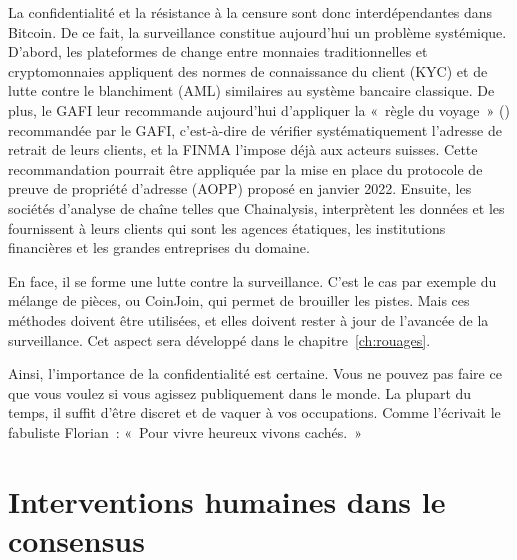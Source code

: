 La confidentialité et la résistance à la censure sont donc interdépendantes dans Bitcoin. De ce fait, la surveillance constitue aujourd'hui un problème systémique. D'abord, les plateformes de change entre monnaies traditionnelles et cryptomonnaies appliquent des normes de connaissance du client (KYC) et de lutte contre le blanchiment (AML) similaires au système bancaire classique. De plus, le GAFI leur recommande aujourd'hui d'appliquer la «~règle du voyage~» ()  recommandée par le GAFI, c'est-à-dire de vérifier systématiquement l'adresse de retrait de leurs clients, et la FINMA l'impose déjà aux acteurs suisses. Cette recommandation pourrait être appliquée par la mise en place du protocole de preuve de propriété d'adresse (AOPP) proposé en janvier 2022. Ensuite, les sociétés d'analyse de chaîne telles que Chainalysis, interprètent les données et les fournissent à leurs clients qui sont les agences étatiques, les institutions financières et les grandes entreprises du domaine.

En face, il se forme une lutte contre la surveillance. C'est le cas par exemple du mélange de pièces, ou CoinJoin, qui permet de brouiller les pistes. Mais ces méthodes doivent être utilisées, et elles doivent rester à jour de l'avancée de la surveillance. Cet aspect sera développé dans le chapitre~\ref{ch:rouages}.

Ainsi, l'importance de la confidentialité est certaine. Vous ne pouvez pas faire ce que vous voulez si vous agissez publiquement dans le monde. La plupart du temps, il suffit d'être discret et de vaquer à vos occupations. Comme l'écrivait le fabuliste Florian~: «~Pour vivre heureux vivons cachés.~»

\section*{Interventions humaines dans le consensus}

